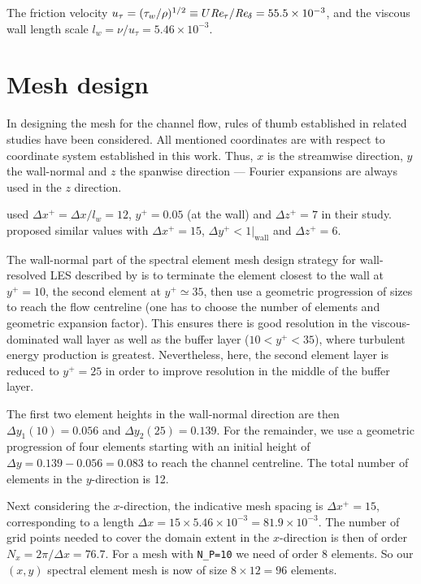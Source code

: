 \documentclass[11pt]{report}
\def\Rey{\mbox{\it Re}}                             %
\begin{document}
The friction velocity $u_\tau=(\tau_w/\rho)^{1/2}\equiv
U\Rey_\tau/\Rey_\delta=55.5\times10^{-3}$, and the viscous wall length
scale $l_w=\nu/u_\tau=5.46\times10^{-3}$.

\section{Mesh design}
\label{sec.meshdesign}

In designing the mesh for the channel flow, rules of thumb established
in related studies \citep{pio97,kmm87,blsc03} have been
considered. All mentioned coordinates are with respect to coordinate
system established in this work. Thus, $x$ is the streamwise
direction, $y$ the wall-normal and $z$ the spanwise direction ---
Fourier expansions are always used in the $z$ direction.


\citet{kmm87} used $\Delta x^+ =\Delta x / l_w = 12$, $y^+ = 0.05$ (at
the wall) and $\Delta z^+ = 7$ in their study. \citep{pio97} proposed
similar values with $\Delta x^+ = 15$, $\Delta y^+ < 1|_\text{wall}$
and $\Delta z^+ = 6$.

The wall-normal part of the spectral element mesh design strategy for
wall-resolved LES described by \citet{blsc03} is to terminate the
element closest to the wall at $y^+=10$, the second element at
$y^+\simeq35$, then use a geometric progression of sizes to reach the
flow centreline (one has to choose the number of elements and
geometric expansion factor).  This ensures there is good resolution in
the viscous-dominated wall layer as well as the buffer layer
($10<y^+<35$), where turbulent energy production is greatest.
Nevertheless, here, the second element layer is reduced to $y^+ = 25$
in order to improve resolution in the middle of the buffer layer.

The first two element heights in the wall-normal direction are then
$\Delta y_1(10)=0.056$ and $\Delta y_2(25)=0.139$. For the remainder,
we use a geometric progression of four elements starting with an
initial height of $\Delta y = 0.139-0.056=0.083$ to reach the channel
centreline.  The total number of elements in the $y$-direction is 12.

Next considering the $x$-direction, the indicative mesh spacing is
$\Delta x^+=15$, corresponding to a length $\Delta x =
15\times5.46\times10^{-3}=81.9\times10^{-3}$.  The number of grid
points needed to cover the domain extent in the $x$-direction is then
of order $N_x=2\pi/\Delta x=76.7$.  For a mesh with \verb|N_P=10| we
need of order 8 elements.  So our $(x,y)$ spectral element mesh is now
of size $8\times12=96$ elements.
\end{document}
